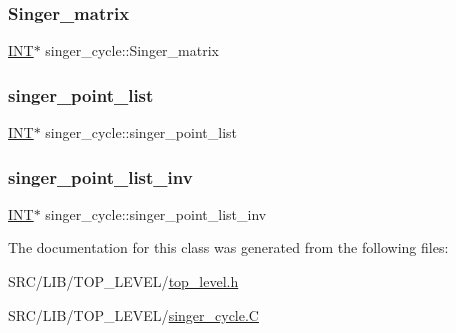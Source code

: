 \mbox{\label{classsinger__cycle_a79a1251fba22d6caaaf82a9550cb1b28}} 
\subsubsection{\texorpdfstring{Singer\+\_\+matrix}{Singer\_matrix}}
{\footnotesize\ttfamily \mbox{\hyperlink{galois_8h_a09fddde158a3a20bd2dcadb609de11dc}{I\+NT}}$\ast$ singer\+\_\+cycle\+::\+Singer\+\_\+matrix}

\mbox{\label{classsinger__cycle_a854718c99bfab8003620c18be530a7a9}} 
\subsubsection{\texorpdfstring{singer\+\_\+point\+\_\+list}{singer\_point\_list}}
{\footnotesize\ttfamily \mbox{\hyperlink{galois_8h_a09fddde158a3a20bd2dcadb609de11dc}{I\+NT}}$\ast$ singer\+\_\+cycle\+::singer\+\_\+point\+\_\+list}

\mbox{\label{classsinger__cycle_a0b4243bb7c407eb2e6d8aad287360c6b}} 
\subsubsection{\texorpdfstring{singer\+\_\+point\+\_\+list\+\_\+inv}{singer\_point\_list\_inv}}
{\footnotesize\ttfamily \mbox{\hyperlink{galois_8h_a09fddde158a3a20bd2dcadb609de11dc}{I\+NT}}$\ast$ singer\+\_\+cycle\+::singer\+\_\+point\+\_\+list\+\_\+inv}



The documentation for this class was generated from the following files\+:\begin{DoxyCompactItemize}
\item 
S\+R\+C/\+L\+I\+B/\+T\+O\+P\+\_\+\+L\+E\+V\+E\+L/\mbox{\hyperlink{top__level_8h}{top\+\_\+level.\+h}}\item 
S\+R\+C/\+L\+I\+B/\+T\+O\+P\+\_\+\+L\+E\+V\+E\+L/\mbox{\hyperlink{singer__cycle_8_c}{singer\+\_\+cycle.\+C}}\end{DoxyCompactItemize}
